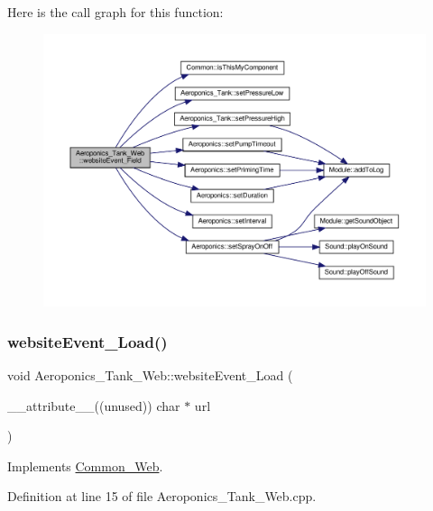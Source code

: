 Here is the call graph for this function\+:
\nopagebreak
\begin{figure}[H]
\begin{center}
\leavevmode
\includegraphics[width=350pt]{class_aeroponics___tank___web_a5693a6f3eacc0a155e5639607368e0ea_cgraph}
\end{center}
\end{figure}
\mbox{\label{class_aeroponics___tank___web_a49ab14d7f9bffac4f4d9adf151589f15}} 
\subsubsection{\texorpdfstring{website\+Event\+\_\+\+Load()}{websiteEvent\_Load()}}
{\footnotesize\ttfamily void Aeroponics\+\_\+\+Tank\+\_\+\+Web\+::website\+Event\+\_\+\+Load (\begin{DoxyParamCaption}\item[{\+\_\+\+\_\+attribute\+\_\+\+\_\+((unused)) char $\ast$}]{url }\end{DoxyParamCaption})\hspace{0.3cm}{\ttfamily [virtual]}}



Implements \hyperlink{class_common___web_a5ce0d5ce6f63279c3b624371d8a76211}{Common\+\_\+\+Web}.



Definition at line 15 of file Aeroponics\+\_\+\+Tank\+\_\+\+Web.\+cpp.

